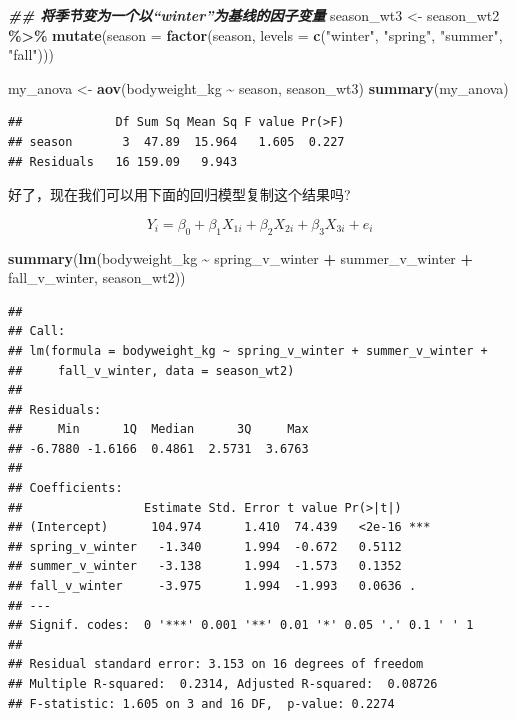 \documentclass[
]{book}
\newenvironment{Shaded}{\begin{snugshade}}{\end{snugshade}}
\newcommand{\AttributeTok}[1]{\textcolor[rgb]{0.13,0.29,0.53}{#1}}
\newcommand{\DocumentationTok}[1]{\textcolor[rgb]{0.56,0.35,0.01}{\textbf{\textit{#1}}}}
\newcommand{\FunctionTok}[1]{\textcolor[rgb]{0.13,0.29,0.53}{\textbf{#1}}}
\newcommand{\NormalTok}[1]{#1}
\newcommand{\OtherTok}[1]{\textcolor[rgb]{0.56,0.35,0.01}{#1}}
\newcommand{\SpecialCharTok}[1]{\textcolor[rgb]{0.81,0.36,0.00}{\textbf{#1}}}
\newcommand{\StringTok}[1]{\textcolor[rgb]{0.31,0.60,0.02}{#1}}
\begin{document}
\begin{Shaded}
\begin{Highlighting}[]
\DocumentationTok{\#\# 将季节变为一个以“winter”为基线的因子变量}
\NormalTok{season\_wt3 }\OtherTok{\textless{}{-}}\NormalTok{ season\_wt2 }\SpecialCharTok{\%\textgreater{}\%}
  \FunctionTok{mutate}\NormalTok{(}\AttributeTok{season =} \FunctionTok{factor}\NormalTok{(season, }\AttributeTok{levels =} \FunctionTok{c}\NormalTok{(}\StringTok{"winter"}\NormalTok{, }\StringTok{"spring"}\NormalTok{,}
                                            \StringTok{"summer"}\NormalTok{, }\StringTok{"fall"}\NormalTok{)))}

\NormalTok{my\_anova }\OtherTok{\textless{}{-}} \FunctionTok{aov}\NormalTok{(bodyweight\_kg }\SpecialCharTok{\textasciitilde{}}\NormalTok{ season, season\_wt3)}
\FunctionTok{summary}\NormalTok{(my\_anova)}
\end{Highlighting}
\end{Shaded}

\begin{verbatim}
##             Df Sum Sq Mean Sq F value Pr(>F)
## season       3  47.89  15.964   1.605  0.227
## Residuals   16 159.09   9.943
\end{verbatim}

好了，现在我们可以用下面的回归模型复制这个结果吗?

\[Y_i = \beta_0 + \beta_1 X_{1i} + \beta_2 X_{2i} + \beta_3 X_{3i} + e_i\]

\begin{Shaded}
\begin{Highlighting}[]
\FunctionTok{summary}\NormalTok{(}\FunctionTok{lm}\NormalTok{(bodyweight\_kg }\SpecialCharTok{\textasciitilde{}}\NormalTok{ spring\_v\_winter }\SpecialCharTok{+}
\NormalTok{             summer\_v\_winter }\SpecialCharTok{+}\NormalTok{ fall\_v\_winter,}
\NormalTok{           season\_wt2))}
\end{Highlighting}
\end{Shaded}

\begin{verbatim}
## 
## Call:
## lm(formula = bodyweight_kg ~ spring_v_winter + summer_v_winter + 
##     fall_v_winter, data = season_wt2)
## 
## Residuals:
##     Min      1Q  Median      3Q     Max 
## -6.7880 -1.6166  0.4861  2.5731  3.6763 
## 
## Coefficients:
##                 Estimate Std. Error t value Pr(>|t|)    
## (Intercept)      104.974      1.410  74.439   <2e-16 ***
## spring_v_winter   -1.340      1.994  -0.672   0.5112    
## summer_v_winter   -3.138      1.994  -1.573   0.1352    
## fall_v_winter     -3.975      1.994  -1.993   0.0636 .  
## ---
## Signif. codes:  0 '***' 0.001 '**' 0.01 '*' 0.05 '.' 0.1 ' ' 1
## 
## Residual standard error: 3.153 on 16 degrees of freedom
## Multiple R-squared:  0.2314, Adjusted R-squared:  0.08726 
## F-statistic: 1.605 on 3 and 16 DF,  p-value: 0.2274
\end{verbatim}
\end{document}

